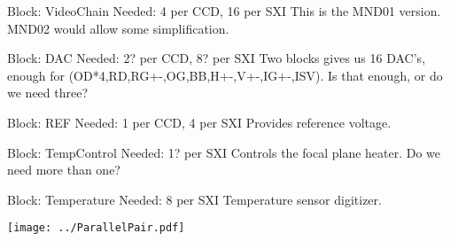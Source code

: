 \documentclass[a4paper,10pt]{report}
\begin{document}
Block: VideoChain
Needed: 4 per CCD, 16 per SXI
This is the MND01 version. MND02 would allow some simplification.

Block: DAC
Needed: 2? per CCD, 8? per SXI
Two blocks gives us 16 DAC's, enough for (OD*4,RD,RG+-,OG,BB,H+-,V+-,IG+-,ISV). Is that enough, or do we need three?

Block: REF
Needed: 1 per CCD, 4 per SXI
Provides reference voltage.

Block: TempControl
Needed: 1? per SXI
Controls the focal plane heater. Do we need more than one?

Block: Temperature
Needed: 8 per SXI
Temperature sensor digitizer.

\begin{center}
\texttt{[image: ../ParallelPair.pdf]}
\end{center}
\end{document}
